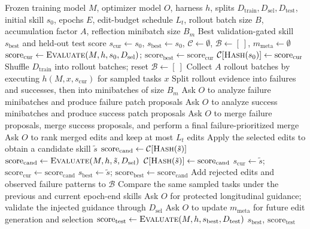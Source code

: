 \begin{algorithm}[t]
\caption{\ourmethod{} skill optimization}
\label{alg:skillopt_appendix}
\begin{algorithmic}[1]
\Require Frozen training model $M$, optimizer model $O$, harness $h$, splits $D_\mathrm{train},D_\mathrm{sel},D_\mathrm{test}$, initial skill $s_0$, epochs $E$, edit-budget schedule $L_t$, rollout batch size $B$, accumulation factor $A$, reflection minibatch size $B_m$
\Ensure Best validation-gated skill $s_\mathrm{best}$ and held-out test score
\State $s_\mathrm{cur} \gets s_0$, $s_\mathrm{best} \gets s_0$, $\mathcal{C} \gets \emptyset$, $\mathcal{B} \gets [\ ]$, $m_\mathrm{meta} \gets \emptyset$
\State $\mathrm{score}_\mathrm{cur} \gets \Call{Evaluate}{M,h,s_0,D_\mathrm{sel}}$; $\mathrm{score}_\mathrm{best} \gets \mathrm{score}_\mathrm{cur}$
\State $\mathcal{C}[\Call{Hash}{s_0}] \gets \mathrm{score}_\mathrm{cur}$
    \State Shuffle $D_\mathrm{train}$ into rollout batches; reset $\mathcal{B} \gets [\ ]$
        \State Collect $A$ rollout batches by executing $h(M,x,s_\mathrm{cur})$ for sampled tasks $x$
        \State Split rollout evidence into failures and successes, then into minibatches of size $B_m$
        \State Ask $O$ to analyze failure minibatches and produce failure patch proposals
        \State Ask $O$ to analyze success minibatches and produce success patch proposals
        \State Ask $O$ to merge failure proposals, merge success proposals, and perform a final failure-prioritized merge
        \State Ask $O$ to rank merged edits and keep at most $L_t$ edits
        \State Apply the selected edits to obtain a candidate skill $\tilde{s}$
            \State $\mathrm{score}_\mathrm{cand} \gets \mathcal{C}[\Call{Hash}{\tilde{s}}]$
        \Else
            \State $\mathrm{score}_\mathrm{cand} \gets \Call{Evaluate}{M,h,\tilde{s},D_\mathrm{sel}}$
            \State $\mathcal{C}[\Call{Hash}{\tilde{s}}] \gets \mathrm{score}_\mathrm{cand}$
        \EndIf
            \State $s_\mathrm{cur} \gets \tilde{s}$; $\mathrm{score}_\mathrm{cur} \gets \mathrm{score}_\mathrm{cand}$
                \State $s_\mathrm{best} \gets \tilde{s}$; $\mathrm{score}_\mathrm{best} \gets \mathrm{score}_\mathrm{cand}$
            \EndIf
        \Else
            \State Add rejected edits and observed failure patterns to $\mathcal{B}$
        \EndIf
    \EndFor
        \State Compare the same sampled tasks under the previous and current epoch-end skills
        \State Ask $O$ for protected longitudinal guidance; validate the injected guidance through $D_\mathrm{sel}$
    \EndIf
        \State Ask $O$ to update $m_\mathrm{meta}$ for future edit generation and selection
    \EndIf
\EndFor
\State $\mathrm{score}_\mathrm{test} \gets \Call{Evaluate}{M,h,s_\mathrm{best},D_\mathrm{test}}$
\State \Return $s_\mathrm{best}$, $\mathrm{score}_\mathrm{test}$
\end{algorithmic}
\end{algorithm}

